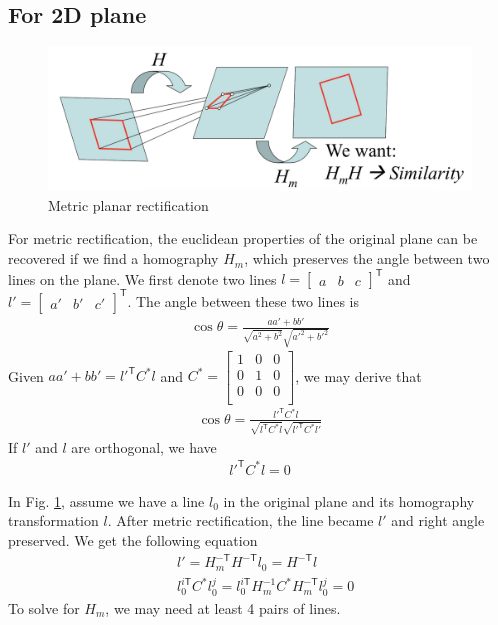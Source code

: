 \documentclass[11pt]{article}
\begin{document}
\subsection{For 2D plane}
\begin{figure}[!h]
\begin{center}
\includegraphics[width=10 cm]{images/metric_rect.png}
\caption{Metric planar rectification}
\label{metric_rect}
\end{center}
\end{figure}
For metric rectification, the euclidean properties of the original plane can be recovered if we find a homography $H_m$, which preserves the angle between two lines on the plane.
We first denote two lines $l=\left[\begin{array}{ccc}a & b & c\end{array}\right]^\mathsf{T}$ and $l'=\left[\begin{array}{ccc}a' & b' & c'\end{array}\right]^\mathsf{T}$. The angle between these two lines is
\begin{align*}
\cos\theta = \frac{aa'+bb'}{\sqrt{a^2+b^2}\sqrt{a'^2+b'^2}}
\end{align*}
Given $aa'+bb'=l'^\mathsf{T} C^\ast l$ and $C^\ast=\left[
      \begin{array}{ccc}
       1 & 0 & 0 \\
       0 & 1 & 0 \\
       0 & 0 & 0 \\
      \end{array}
\right]$, we may derive that
\begin{align*}
\cos\theta = \frac{l'^\mathsf{T} C^\ast l}{\sqrt{l^\mathsf{T} C^\ast l}\sqrt{l'^\mathsf{T} C^\ast l'}}
\end{align*}
If $l'$ and $l$ are orthogonal, we have 
\begin{align*}
l'^\mathsf{T} C^\ast l = 0
\end{align*}

In Fig. \ref{metric_rect}, assume we have a line $l_0$ in the original plane and its homography transformation $l$. After metric rectification, the line became $l'$ and right angle preserved. We get the following equation
\begin{align}
&l'=H^{-\mathsf{T}}_mH^{-\mathsf{T}}l_0=H^{-\mathsf{T}}l \\
&l^{i\mathsf{T}}_0C^\ast l^j_0 = l^{i\mathsf{T}}_0H^{-1}_mC^\ast H^{-\mathsf{T}}_ml^j_0 = 0
\end{align}
To solve for $H_m$, we may need at least 4 pairs of lines.
\end{document}
